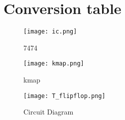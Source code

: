 \documentclass{article}
\begin{document}
\section{Conversion table}
\begin{table}[ht]
\centering
{}
\caption{}
\label{conversion table}
\end{table}


\begin{figure}
	\centering																	   		
	\texttt{[image: ic.png]}
	\caption{7474}
	\label{fig:circuit}	
\end{figure}
\begin{figure}
	\centering
	\texttt{[image: kmap.png]}
	\caption{kmap}
	\label{fig:circuit}
\end{figure}



\begin{figure}
\centering
\texttt{[image: T\_flipflop.png]}
\caption{Circuit Diagram}

\end{figure}
\end{document}
